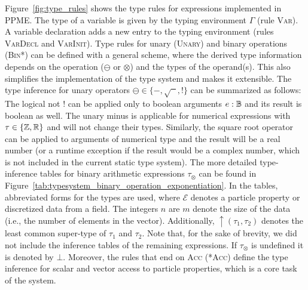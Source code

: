   Figure~\ref{fig:type_rules} shows the type rules for expressions implemented in
  PPME. The type of a variable is given by the typing environment $\Gamma$ (rule
  \textsc{Var}). A variable declaration adds a new entry to the typing environment
  (rules \textsc{VarDecl} and \textsc{VarInit}). Type rules for unary
  (\textsc{Unary}) and binary operations (\textsc{Bin*}) can be defined with a
  general scheme, where the derived type information depends on the operation
  ($\ominus$ or $\otimes$) and the types of the operand(s). This also simplifies the
  implementation of the type system and makes it extensible.%
  The type inference for unary operators $\ominus\in\{-,\sqrt{\phantom{x}},!\}$ can
  be summarized as follows: The logical not $!$ can be applied only to boolean
  arguments $e : \mathbb{B}$ and its result is boolean as well. The unary minus is
  applicable for numerical expressions with $\tau \in \{ \mathbb{Z}, \mathbb{R} \}$ and will
  not change their types. Similarly, the square root operator can be applied to
  arguments of numerical type and the result will be a real number (or a runtime exception
  if the result would be a complex number, which is not included in the current static type system).
  The more detailed type-inference tables for binary arithmetic expressions
  $\tau_\otimes$ can be found in
  Figure~\ref{tab:typesystem_binary_operation_exponentiation}. In the tables,
  abbreviated forms for the types are used, where $\mathcal{E}$
  denotes a particle property or discretized data from a field.
  The integers $n$ are $m$ denote the size of the data (i.e., the number of
  elements in the vector). Additionally, $\uparrow(\tau_1, \tau_2)$
  denotes the least common super-type of $\tau_1$ and $\tau_2$. Note that, for the
  sake of brevity, we did not include the inference tables of the remaining
  expressions. If $\tau_\otimes$ is undefined it is denoted by $\bot$.
  Moreover, the rules that end on \textsc{Acc} (\textsc{*Acc}) define the type
  inference for scalar and vector access to particle properties, which is a core task
  of the system.


